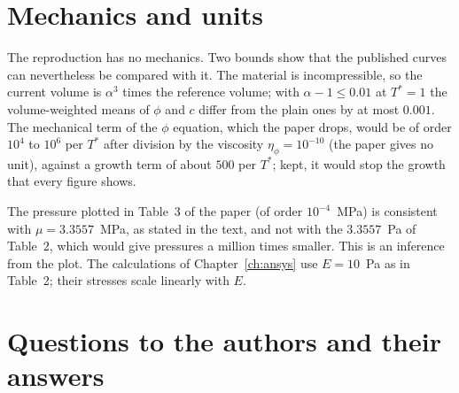 \section{Mechanics and units}

The reproduction has no mechanics. Two bounds show that the published curves
can nevertheless be compared with it. The material is incompressible, so the
current volume is $\alpha^3$ times the reference volume; with
$\alpha-1\le0.01$ at $T^*=1$ the volume-weighted means of $\phi$ and $c$
differ from the plain ones by at most $0.001$. The mechanical term of the
$\phi$ equation, which the paper drops, would be of order $10^4$ to $10^6$
per $T^*$ after division by the viscosity $\eta_\phi=10^{-10}$ (the paper gives no unit), against a
growth term of about $500$ per $T^*$; kept, it would stop the growth that
every figure shows.

The pressure plotted in Table~3 of the paper (of order $10^{-4}$~MPa) is
consistent with $\mu=3.3557$~MPa, as stated in the text, and not with the
$3.3557$~Pa of Table~2, which would give pressures a million times smaller.
This is an inference from the plot. The calculations of
Chapter~\ref{ch:ansys} use $E=10$~Pa as in Table~2; their stresses scale
linearly with $E$.

\section{Questions to the authors and their answers}

